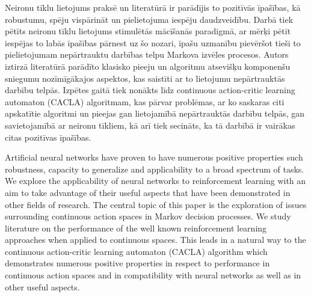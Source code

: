 \documentclass{ludis} %
\begin{document}
\maketitle

\begin{abstract-lv}
Neironu tīklu lietojums praksē un literatūrā ir parādījis to pozitīvās īpašības, kā robustumu, spēju vispārināt un pielietojuma iespēju daudzveidību.
Darbā tiek pētīts neironu tīklu lietojums stimulētās mācīšanās paradigmā, ar mērķi pētīt iespējas to labās īpašības pārnest uz šo nozari, īpašu uzmanību pievēršot tieši to pielietojumam nepārtrauktu darbības telpu Markova izvēles procesos.
Autors iztirzā literatūrā parādīto klasisko pieeju un algoritmu atsevišķu komponenšu sniegumu nozīmīgākajos aspektos, kas saistīti ar to lietojumu nepārtrauktās darbību telpās.
Izpētes gaitā tiek nonākts līdz continuous action-critic learning automaton (CACLA) algoritmam, kas pārvar problēmas, ar ko saskaras citi apskatītie algoritmi un pieejas gan lietojamībā nepārtrauktās darbību telpās, gan savietojamībā ar neironu tīkliem, kā arī tiek secināts, ka tā darbībā ir vairākas citas pozitīvas īpašības.

\end{abstract-lv}
\clearpage

\begin{abstract-en}
Artificial neural networks have proven to have numerous positive properties such robustness, capacity to generalize and applicability to a broad spectrum of tasks.
We explore the applicability of neural networks to reinforcement learning with an aim to take advantage of their useful aspects that have been demonstrated in other fields of research.
The central topic of this paper is the exploration of issues surrounding continuous action spaces in Markov decision processes.
We study literature on the performance of the well known reinforcement learning approaches when applied to continuous spaces.
This leads in a natural way to the continuous action-critic learning automaton (CACLA) algorithm which demonstrates numerous positive properties in respect to performance in continuous action spaces and in compatibility with neural networks as well as in other useful aspects.

\end{abstract-en}
\end{document}
